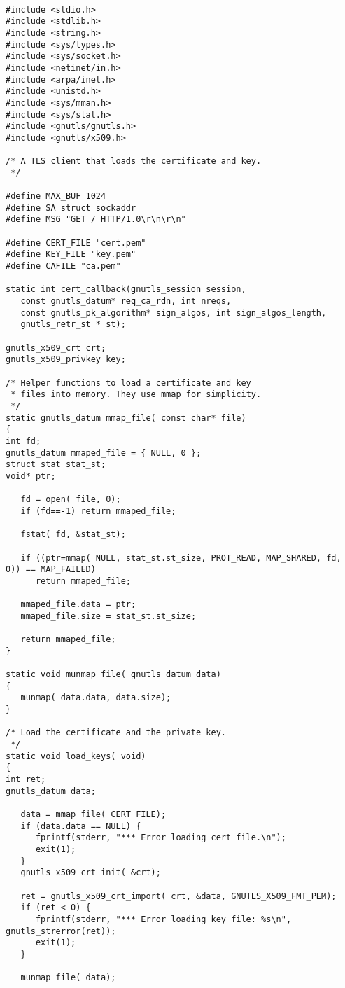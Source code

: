 \begin{verbatim}

#include <stdio.h>
#include <stdlib.h>
#include <string.h>
#include <sys/types.h>
#include <sys/socket.h>
#include <netinet/in.h>
#include <arpa/inet.h>
#include <unistd.h>
#include <sys/mman.h>
#include <sys/stat.h>
#include <gnutls/gnutls.h>
#include <gnutls/x509.h>

/* A TLS client that loads the certificate and key.
 */

#define MAX_BUF 1024
#define SA struct sockaddr
#define MSG "GET / HTTP/1.0\r\n\r\n"

#define CERT_FILE "cert.pem"
#define KEY_FILE "key.pem"
#define CAFILE "ca.pem"

static int cert_callback(gnutls_session session,
   const gnutls_datum* req_ca_rdn, int nreqs,
   const gnutls_pk_algorithm* sign_algos, int sign_algos_length,
   gnutls_retr_st * st);

gnutls_x509_crt crt;
gnutls_x509_privkey key;

/* Helper functions to load a certificate and key
 * files into memory. They use mmap for simplicity.
 */
static gnutls_datum mmap_file( const char* file)
{
int fd;
gnutls_datum mmaped_file = { NULL, 0 };
struct stat stat_st;
void* ptr;

   fd = open( file, 0);
   if (fd==-1) return mmaped_file;
   
   fstat( fd, &stat_st);
   
   if ((ptr=mmap( NULL, stat_st.st_size, PROT_READ, MAP_SHARED, fd, 0)) == MAP_FAILED)
      return mmaped_file;
   
   mmaped_file.data = ptr;
   mmaped_file.size = stat_st.st_size;
   
   return mmaped_file;
}

static void munmap_file( gnutls_datum data)
{
   munmap( data.data, data.size);
}

/* Load the certificate and the private key.
 */
static void load_keys( void)
{
int ret;
gnutls_datum data;

   data = mmap_file( CERT_FILE);
   if (data.data == NULL) {
      fprintf(stderr, "*** Error loading cert file.\n");
      exit(1);
   }
   gnutls_x509_crt_init( &crt);
   
   ret = gnutls_x509_crt_import( crt, &data, GNUTLS_X509_FMT_PEM);
   if (ret < 0) {
      fprintf(stderr, "*** Error loading key file: %s\n", gnutls_strerror(ret));
      exit(1);
   }

   munmap_file( data);


\end{verbatim}
